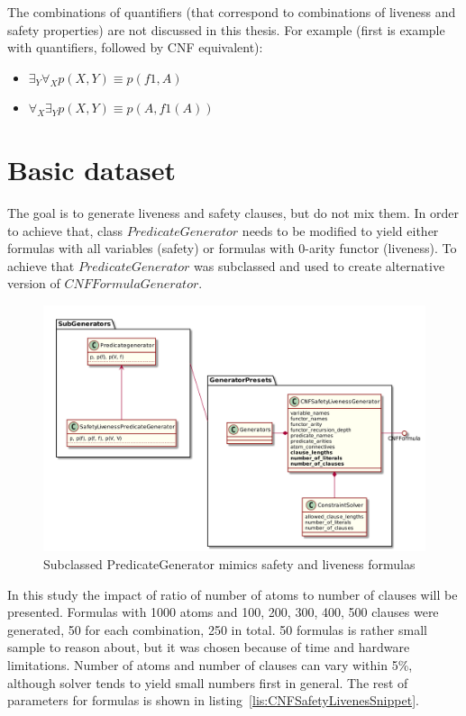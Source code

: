 The combinations of quantifiers (that correspond to combinations of liveness and safety properties) are not discussed in this thesis. For example (first is example with quantifiers, followed by CNF equivalent):
\begin{itemize}
\item $\exists_Y \forall_X p(X, Y) \equiv p(f1, A)$
\item $\forall_X \exists_Y p(X, Y) \equiv p(A,f1(A)) $
\end{itemize}

\section{Basic dataset}

The goal is to generate liveness and safety clauses, but do not mix them. In order to achieve that, class $PredicateGenerator$ needs to be modified to yield either formulas with all variables (safety) or formulas with 0-arity functor (liveness). To achieve that $PredicateGenerator$ was subclassed and used to create alternative version of $CNFFormulaGenerator$.

\begin{figure}[H]
\begin{centering}
  \includegraphics[width=\textwidth]{logic-formula-generator/fol/safety_liveness_predicate_generator.png}
  \caption{Subclassed PredicateGenerator mimics safety and liveness formulas}
\end{centering}
\end{figure}

In this study the impact of ratio of number of atoms to number of clauses will be presented.
Formulas with 1000 atoms and 100, 200, 300, 400, 500 clauses were generated, 50 for each combination, 250 in total. 50 formulas is rather small sample to reason about, but it was chosen because of time and hardware limitations. Number of atoms and number of clauses can vary within 5\%, although solver tends to yield small numbers first in general. The rest of parameters for formulas is shown in listing~\ref{lis:CNFSafetyLivenesSnippet}.

